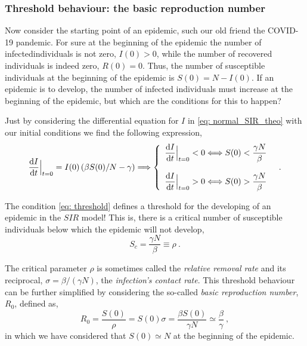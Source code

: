 \subsubsection*{Threshold behaviour: the basic reproduction number}

Now consider the starting point of an epidemic, such our old friend the
COVID-19 pandemic. For sure at the beginning of the epidemic the number of
infectedindividuals is not zero, $I(0)>0$, while the number of recovered
individuals is indeed zero, $R(0)=0$. Thus, the number of susceptible
individuals at the beginning of the epidemic is $S(0)=N-I(0)$. If an epidemic
is to develop, the number of infected individuals must increase at the
beginning of the epidemic, but which are the conditions for this to happen?

Just by considering the differential equation for $I$ in \cref{eq:
  normal_SIR_theo} with our initial conditions we find the following
expression,
\begin{equation}\label{eq: threshold}
  \frac{\mathrm{d} I}{\mathrm{d} t}\Big|_{t=0}^{}=I(0)\left(\beta
    S(0)/N-\gamma\right)\Longrightarrow\left\{\begin{array}{l}
    \displaystyle\frac{\mathrm{d} I}{\mathrm{d} t}\Big|_{t=0}^{}<0 \Longleftrightarrow
    S(0)<\frac{\gamma N}{\beta} \\\\
    \displaystyle\frac{\mathrm{d} I}{\mathrm{d} t}\Big|_{t=0}^{}>0 \Longleftrightarrow
    S(0)>\frac{\gamma N}{\beta}
  \end{array}\right. \ \ .
\end{equation}

The condition \cref{eq: threshold} defines a threshold for the developing of an
epidemic in the $SIR$ model! This is, there is a critical number of susceptible
individuals below which the epidemic will not develop,
\begin{equation}
  S_c=\frac{\gamma N}{\beta}\equiv \rho \ .
\end{equation}

The critical parameter $\rho$ is sometimes called the \textit{relative removal
  rate} and its reciprocal, $\sigma=\beta/(\gamma N)$, the \textit{infection’s
  contact rate}. This threshold behaviour can be further simplified by
considering the so-called \textit{basic reproduction number}, $R_0$, defined
as,
\begin{equation}
  R_0=\frac{S(0)}{\rho}=S(0)\sigma=\frac{\beta S(0)}{\gamma
    N}\simeq\frac{\beta}{\gamma} \ ,
\end{equation}
in which we have considered that $S(0)\simeq N$ at the beginning of the
epidemic.

